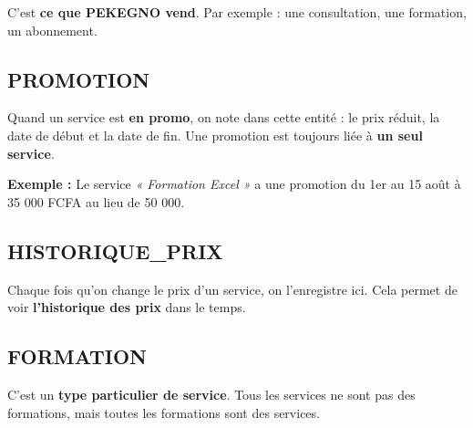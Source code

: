 \documentclass[12pt,a4paper]{article}
\begin{document}
\noindent\begin{minipage}[t]{0.3\textwidth}
\end{minipage}
\hfill
\begin{minipage}[t]{0.65\textwidth}
C'est \textbf{ce que PEKEGNO vend}. Par exemple : une consultation, une formation, un abonnement.

\vspace{4pt}
\end{minipage}

\subsection{PROMOTION}

Quand un service est \textbf{en promo}, on note dans cette entité : le prix réduit, la date de début et la date de fin. Une promotion est toujours liée à \textbf{un seul service}.

\begin{exemplebox}
    \textbf{Exemple :} Le service \textit{« Formation Excel »} a une promotion du 1er au 15 août à 35 000 FCFA au lieu de 50 000.
\end{exemplebox}

\subsection{HISTORIQUE\_PRIX}

Chaque fois qu'on change le prix d'un service, on l'enregistre ici. Cela permet de voir \textbf{l'historique des prix} dans le temps.

\subsection{FORMATION}

C'est un \textbf{type particulier de service}. Tous les services ne sont pas des formations, mais toutes les formations sont des services.
\end{document}
